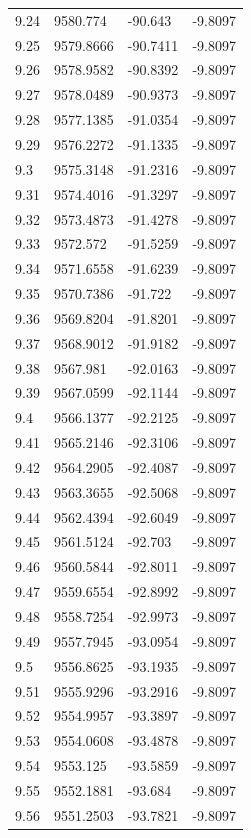 \begin{table}[H]
\begin{tabular}{llll}
9.24 & 9580.774 & -90.643 & -9.8097 \\
9.25 & 9579.8666 & -90.7411 & -9.8097 \\
9.26 & 9578.9582 & -90.8392 & -9.8097 \\
9.27 & 9578.0489 & -90.9373 & -9.8097 \\
9.28 & 9577.1385 & -91.0354 & -9.8097 \\
9.29 & 9576.2272 & -91.1335 & -9.8097 \\
9.3 & 9575.3148 & -91.2316 & -9.8097 \\
9.31 & 9574.4016 & -91.3297 & -9.8097 \\
9.32 & 9573.4873 & -91.4278 & -9.8097 \\
9.33 & 9572.572 & -91.5259 & -9.8097 \\
9.34 & 9571.6558 & -91.6239 & -9.8097 \\
9.35 & 9570.7386 & -91.722 & -9.8097 \\
9.36 & 9569.8204 & -91.8201 & -9.8097 \\
9.37 & 9568.9012 & -91.9182 & -9.8097 \\
9.38 & 9567.981 & -92.0163 & -9.8097 \\
9.39 & 9567.0599 & -92.1144 & -9.8097 \\
9.4 & 9566.1377 & -92.2125 & -9.8097 \\
9.41 & 9565.2146 & -92.3106 & -9.8097 \\
9.42 & 9564.2905 & -92.4087 & -9.8097 \\
9.43 & 9563.3655 & -92.5068 & -9.8097 \\
9.44 & 9562.4394 & -92.6049 & -9.8097 \\
9.45 & 9561.5124 & -92.703 & -9.8097 \\
9.46 & 9560.5844 & -92.8011 & -9.8097 \\
9.47 & 9559.6554 & -92.8992 & -9.8097 \\
9.48 & 9558.7254 & -92.9973 & -9.8097 \\
9.49 & 9557.7945 & -93.0954 & -9.8097 \\
9.5 & 9556.8625 & -93.1935 & -9.8097 \\
9.51 & 9555.9296 & -93.2916 & -9.8097 \\
9.52 & 9554.9957 & -93.3897 & -9.8097 \\
9.53 & 9554.0608 & -93.4878 & -9.8097 \\
9.54 & 9553.125 & -93.5859 & -9.8097 \\
9.55 & 9552.1881 & -93.684 & -9.8097 \\
9.56 & 9551.2503 & -93.7821 & -9.8097 \\

\end{tabular}
\end{table}
